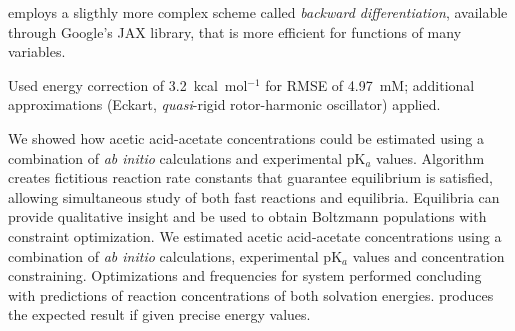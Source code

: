 \overreact employs a sligthly more complex scheme called
\emph{backward differentiation}, available through Google's JAX library, that
is more efficient for functions of many variables.

Used energy correction of 3.2~kcal~mol$^{-1}$ for RMSE of 4.97~mM;\@
additional approximations (Eckart,
\emph{quasi}-rigid rotor-harmonic oscillator) applied.

We showed how
acetic acid-acetate concentrations could be estimated using a combination of \emph{ab initio} calculations and experimental pK$_a$ values.
Algorithm creates fictitious reaction rate constants that guarantee equilibrium is satisfied,
allowing simultaneous study of both fast reactions and equilibria.
Equilibria can provide qualitative insight and be used to obtain Boltzmann populations with constraint optimization.
We estimated acetic acid-acetate concentrations using a combination of \emph{ab initio} calculations,
experimental pK$_a$ values and  concentration constraining.
Optimizations and frequencies for  system performed concluding with predictions of reaction concentrations of both solvation energies.
\overreact{} produces the expected result if given precise energy values.



